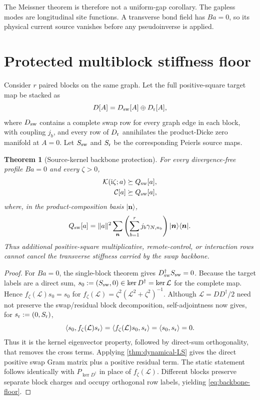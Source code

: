 \documentclass[11pt]{article}
\newtheorem{theorem}{Theorem}[section]
\theoremstyle{definition}
\theoremstyle{remark}
\newcommand{\cK}{\mathcal K}
\newcommand{\cC}{\mathcal C}
\newcommand{\cL}{\mathcal L}
\newcommand{\I}{\mathrm i}
\newcommand{\ket}[1]{\lvert #1\rangle}
\newcommand{\bra}[1]{\langle #1\rvert}
\newcommand{\norm}[1]{\lVert #1\rVert}
\newcommand{\ip}[2]{\langle #1,#2\rangle}
\begin{document}
The Meissner theorem is therefore not a uniform-gap corollary.  The gapless modes are longitudinal site
functions.  A transverse bond field has $Ba=0$, so its physical current source vanishes before any
pseudoinverse is applied.

\section{Protected multiblock stiffness floor}
\label{sec:multiblock}

Consider $r$ paired blocks on the same graph.  Let the full positive-square target map be stacked as
\begin{equation}
 D[A]=D_{\rm sw}[A]\oplus D_{\rm r}[A],
 \label{eq:stacked-map}
\end{equation}
where $D_{\rm sw}$ contains a complete swap row for every graph edge in each block, with coupling $j_b$,
and every row of $D_{\rm r}$ annihilates the product-Dicke zero manifold at $A=0$.  Let
$S_{\rm sw}$ and $S_{\rm r}$ be the corresponding Peierls source maps.

\begin{theorem}[Source-kernel backbone protection]
\label{thm:backbone}
For every divergence-free profile $Ba=0$ and every $\zeta>0$,
\begin{align}
 \cK(\I\zeta;a)&\succeq Q_{\rm sw}[a],
 \label{eq:backbone-dynamic}\\
 \cC[a]&\succeq Q_{\rm sw}[a],
 \label{eq:backbone-static}
\end{align}
where, in the product-composition basis $\ket{\bm n}$,
\begin{equation}
 Q_{\rm sw}[a]
 =\norm a^2\sum_{\bm n}
 \left(\sum_{b=1}^rj_b\gamma_{N,n_b}\right)
 \ket{\bm n}\bra{\bm n}.
 \label{eq:backbone-floor}
\end{equation}
Thus additional positive-square multiplicative, remote-control, or interaction rows cannot cancel the
transverse stiffness carried by the swap backbone.
\end{theorem}

\begin{proof}
For $Ba=0$, the single-block theorem gives
$D_{\rm sw}^\dagger S_{\rm sw}=0$.  Because the target labels are a direct sum,
$s_0:=(S_{\rm sw},0)\in\ker D^\dagger=\ker\cL$ for the complete map.  Hence
$f_\zeta(\cL)s_0=s_0$ for
$f_\zeta(\cL)=\zeta^2(\cL^2+\zeta^2)^{-1}$.  Although $\cL=DD^\dagger/2$ need not preserve the
swap/residual block decomposition, self-adjointness now gives, for
$s_{\rm r}:=(0,S_{\rm r})$,
\begin{equation}
 \ip{s_0}{f_\zeta(\cL)s_{\rm r}}
 =\ip{f_\zeta(\cL)s_0}{s_{\rm r}}
 =\ip{s_0}{s_{\rm r}}=0.
\end{equation}
Thus it is the kernel eigenvector property, followed by direct-sum orthogonality, that removes the cross
terms.  Applying \cref{thm:dynamical-LS} gives the direct positive swap Gram matrix plus a positive
residual term.  The static statement follows identically with $P_{\ker D^\dagger}$ in place of
$f_\zeta(\cL)$.  Different blocks preserve separate block charges and occupy orthogonal row labels,
yielding \eqref{eq:backbone-floor}.
\end{proof}
\end{document}
